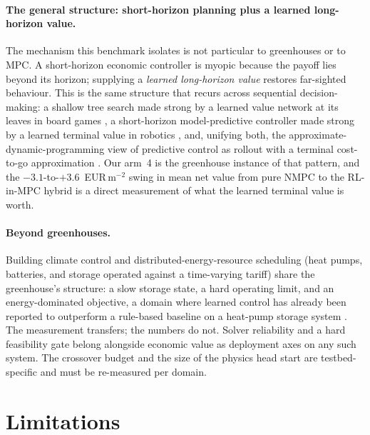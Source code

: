 \documentclass[11pt]{article}
\begin{document}
\paragraph{The general structure: short-horizon planning plus a learned long-horizon value.} The mechanism this benchmark isolates is not particular to greenhouses or to MPC. A short-horizon economic controller is myopic because the payoff lies beyond its horizon; supplying a \emph{learned long-horizon value} restores far-sighted behaviour. This is the same structure that recurs across sequential decision-making: a shallow tree search made strong by a learned value network at its leaves in board games \citep{silver2016alphago}, a short-horizon model-predictive controller made strong by a learned terminal value in robotics \citep{hansen2022tdmpc, lowrey2019polo}, and, unifying both, the approximate-dynamic-programming view of predictive control as rollout with a terminal cost-to-go approximation \citep{bertsekas2019rloptimalcontrol}. Our arm~4 is the greenhouse instance of that pattern, and the $-3.1$-to-$+3.6$~EUR\,m$^{-2}$ swing in mean net value from pure NMPC to the RL-in-MPC hybrid is a direct measurement of what the learned terminal value is worth.

\paragraph{Beyond greenhouses.} Building climate control and distributed-energy-resource scheduling (heat pumps, batteries, and storage operated against a time-varying tariff) share the greenhouse's structure: a slow storage state, a hard operating limit, and an energy-dominated objective, a domain where learned control has already been reported to outperform a rule-based baseline on a heat-pump storage system \citep{jang2026offlinerlgreenhouse}. The measurement transfers; the numbers do not. Solver reliability and a hard feasibility gate belong alongside economic value as deployment axes on any such system. The crossover budget and the size of the physics head start are testbed-specific and must be re-measured per domain.

\section{Limitations}\label{sec:limitations}
\end{document}
